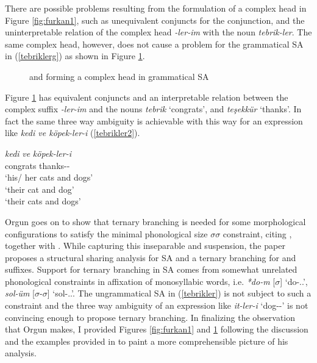 There are possible problems resulting from the formulation of a complex head in Figure \ref{fig:furkan1}, such as unequivalent conjuncts for the conjunction, and the uninterpretable relation of the complex head \textit{-ler-im} with the noun \textit{tebrik-ler}. The same complex head, however, does not cause a problem for the grammatical SA in (\ref{tebriklerg}) as shown in Figure \ref{fig:furkan2}.

\begin{figure}[hbt!]
    \centering
    \caption{{\Pl} and {\Poss} forming a complex head in grammatical SA}
    \label{fig:furkan2}
\end{figure}

Figure \ref{fig:furkan2} has equivalent conjuncts and an interpretable relation between the complex suffix \textit{-ler-im} and the nouns \textit{tebrik} `congrats', and \textit{teşekkür} `thanks'. In fact the same three way ambiguity is achievable with this way for an expression like \textit{kedi ve köpek-ler-i} (\ref{tebrikler2}).

\begin{exe}
    \ex \label{tebrikler2}
    \gll 
    \textit{kedi} \textit{ve} \textit{köpek-ler-i} \\ congrats {\And} thanks-{\Pl}-{\Poss} \\
    \glt `his/ her cats and dogs' \\ `their cat and dog' \\ `their cats and dogs'
\end{exe}



Orgun goes on to show that ternary branching is needed for some morphological configurations to satisfy the minimal phonological size $\sigma\sigma$ constraint, citing \cite{ito1989notes}, together with \cite{orgun1992turkish}. While capturing this inseparable {\Pl} and {\Poss} suspension, the paper proposes a structural sharing analysis for SA and a ternary branching for {\Pl} and {\Poss} suffixes. Support for ternary branching in SA comes from somewhat unrelated phonological constraints in affixation of monosyllabic words, i.e. \textit{*do-m} [$\sigma$] `do-{\Poss}.{\First}.{\Sg}', \textit{sol-üm} [$\sigma$-$\sigma$] `sol-{\Poss}.{\First}.{\Sg}'. The ungrammatical SA in (\ref{tebrikler}) is not subject to such a constraint and the three way ambiguity of an expression like \textit{it-ler-i} `dog-{\Pl}-{\Poss}' is not convincing enough to propose ternary branching. In finalizing the observation that Orgun makes, I provided Figures \ref{fig:furkan1} and \ref{fig:furkan2} following the discussion and the examples provided in \cite{orgun1995flat} to paint a more comprehensible picture of his analysis.

